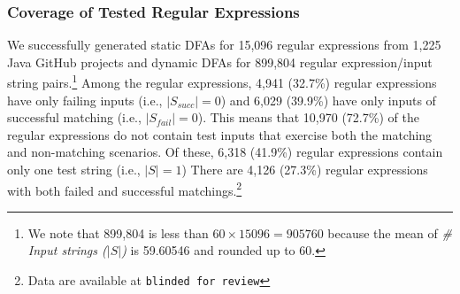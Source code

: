 
\subsubsection{Coverage of Tested Regular Expressions}
We successfully generated static DFAs for 15,096 regular expressions from 1,225 Java GitHub projects  and dynamic DFAs for 899,804 regular expression/input string pairs.\footnote{We note that 899,804 is less than $60 \times 15096 = 905760$ because the mean of {\em\# Input strings ($\lvert S \rvert$)} is 59.60546 and rounded up to 60.}%
Among the regular expressions, 4,941 (32.7\%)  regular expressions have only failing inputs (i.e., $\lvert S_{succ} \rvert = 0$) and 6,029 (39.9\%) have only inputs of successful matching (i.e.,  $\lvert S_{fail} \rvert = 0$). This means that 10,970 (72.7\%) of the regular expressions do not contain test inputs that exercise both the matching and non-matching scenarios. Of these, 6,318 (41.9\%) regular expressions contain only one test string (i.e., $\lvert S \rvert = 1$) There are  4,126 (27.3\%) regular expressions with both failed and successful matchings.\footnote{Data are available at \texttt{blinded for review}} %

